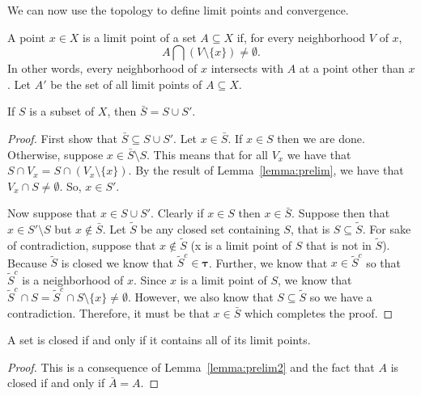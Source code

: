 We can now use the topology to define limit points and convergence.

\begin{definition}
	\label{def:limit-point}
	A point \(x \in X\) is a limit point of a set  \(A \subseteq X\) if, for every neighborhood  \(V\) of  \(x\), 
	 \[
		 A \bigcap\left( V\setminus\{x\} \right)\neq \emptyset
	.\] 
	In other words, every neighborhood of \(x\) intersects with  \(A\) at a point other than \(x\). Let \(A'\) be the set of all limit points of  \(A \subseteq X\).
\end{definition}
\begin{lemma}[]
	\label{lemma:prelim2}
	If \(S\) is a subset of  \(X\), then  \(\bar{S} = S \cup S'\).
\end{lemma}
\begin{proof}
	First show that \(\bar{S} \subseteq S \cup S'\). Let \(x \in \bar{S}\). If \(x \in S\) then we are done. Otherwise, suppose \(x \in \bar{S}\setminus S\). This means that for all \(V_x\) we have that \(S \cap V_x = S\cap \left(V_x\setminus\{x\}\right).\) By the result of Lemma~\ref{lemma:prelim}, we have that \(V_x \cap S \neq \emptyset\). So, \(x \in S'\). 

	Now suppose that \(x \in S \cup S'\). Clearly if  \(x \in S\) then \(x\in \bar{S}\). Suppose then that  \(x \in S'\setminus S\) but \(x \not\in \bar{S}\). Let \(\tilde S\) be any closed set containing  \(S\), that is  \(S \subseteq \tilde S\). For sake of contradiction, suppose that  \(x \not\in \tilde S\) (x is a limit point of \(S\) that is not in  \(\tilde S\)). Because \(\tilde S\) is closed we know that  \(\tilde S^c \in \boldsymbol{\tau}\). Further, we know that \(x \in \tilde S^c\) so that  \(\tilde S^c\) is a neighborhood of \(x\). Since \(x\) is a limit point of  \(S\), we know that  \(\tilde S^c \cap S = \tilde S^c \cap S \setminus\{x\} \neq \emptyset\). However, we also know that \(S \subseteq \tilde S\) so we have a contradiction. Therefore, it must be that  \(x \in \bar{S}\) which completes the proof.
\end{proof}


\begin{lemma}
	\label{lemma:closed}
	A set is closed if and only if it contains all of its limit points.
\end{lemma}
\begin{proof}
	This is a consequence of Lemma~\ref{lemma:prelim2} and the fact that \(A\) is closed if and only if  \(\bar{A} = A\).
\end{proof}


